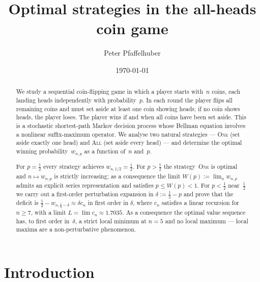 \documentclass[12pt]{article}
\title{Optimal strategies in the all-heads coin game}
\author{Peter Pfaffelhuber}
\date{\today}
\theoremstyle{definition}
\theoremstyle{remark}
\newcommand{\One}{\textsc{One}}
\newcommand{\All}{\textsc{All}}
\begin{document}
\maketitle

\begin{abstract}
  We study a sequential coin-flipping game in which a player starts
  with~$n$ coins, each landing heads independently with
  probability~$p$.  In each round the player flips all remaining coins
  and must set aside at least one coin showing heads; if no coin shows
  heads, the player loses.  The player wins if and when all coins have
  been set aside.  This is a stochastic shortest-path Markov decision
  process whose Bellman equation involves a nonlinear suffix-maximum
  operator.  We analyse two natural strategies --- \One{} (set aside
  exactly one head) and \All{} (set aside every head) --- and
  determine the optimal winning probability~$w_{n,p}$ as a function
  of~$n$ and~$p$.

  For $p=\tfrac12$ every strategy
  achieves $w_{n,1/2}=\tfrac12$.  For $p>\tfrac12$ the
  strategy~\One{} is optimal and $n\mapsto w_{n,p}$ is strictly
  increasing; as a consequence the limit $W(p):=\lim_n w_{n,p}$
  admits an explicit series representation and satisfies
  $p\le W(p)<1$.  For $p<\tfrac12$ near~$\tfrac12$ we carry out a
  first-order perturbation expansion in $\delta:=\tfrac12-p$ and prove
  that the deficit is 
  $\tfrac12-w_{n,\tfrac 12 - \delta} \approx \delta c_n$ in first order in $\delta$, 
  where $c_n$ satisfies a linear recursion for $n\ge 7$, with
  a limit $L=\lim c_n\approx 1.7035$.  As a consequence the optimal
  value sequence has, to first order in~$\delta$, a strict local
  minimum at $n=5$ and no local maximum --- local maxima are a
  non-perturbative phenomenon.
\end{abstract}

\section{Introduction}\label{sec:intro}
\end{document}
